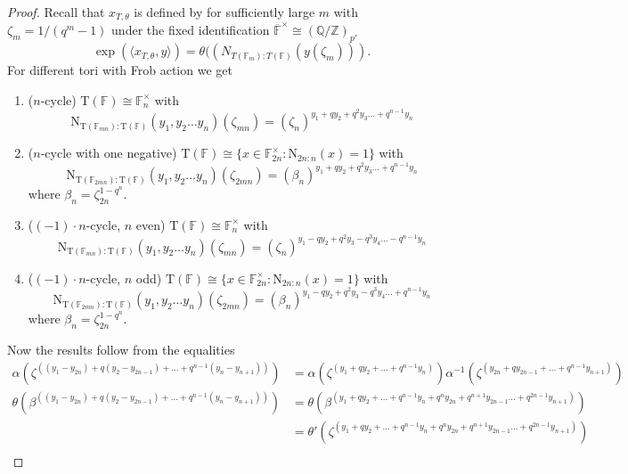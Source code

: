 \documentclass[12pt, reqno]{amsart}
\theoremstyle{definition}
\theoremstyle{definition}
\theoremstyle{definition}
\newcommand{\multiplicativegroup}[1]{#1^{\times}}
\newcommand{\FieldNorm}[2]{\mathrm{N}_{#1:#2}}
\newcommand{\finiteField}{\mathbb{F}}
\newcommand{\algebraicClosure}[1]{\overline{#1}}
\newcommand{\algebraicGroup}[1]{\boldsymbol{\mathrm{#1}}}
\begin{document}
\begin{proof}
Recall that $x_{T,\theta}$ is defined by for sufficiently large $m$ with $\zeta_m = 1/(q^m-1)$ under the fixed identification $\multiplicativegroup{\algebraicClosure{\finiteField}} \cong (\mathbb{Q}/\mathbb{Z})_{p'}$
\[
    \exp(\langle x_{T,\theta},y\rangle) = \theta((N_{T(\finiteField_m):T(\finiteField)}(y(\zeta_m))).
\]
For different tori with Frob action we get
\begin{enumerate}
    \item ($n$-cycle) $\algebraicGroup{T}(\finiteField) \cong \finiteField_n^\times$ with $$\FieldNorm{\algebraicGroup{T}(\finiteField_{mn})}{\algebraicGroup{T}(\finiteField)}(y_1,y_2 \hdots y_n)(\zeta_{mn}) = (\zeta_n)^{y_1+qy_2+q^2y_3 \hdots +q^{n-1}y_n}$$
    \item ($n$-cycle with one negative) $\algebraicGroup{T}(\finiteField) \cong \{x \in \finiteField_{2n}^\times: \FieldNorm{2n}{n}(x) = 1\}$ with $$\FieldNorm{\algebraicGroup{T}(\finiteField_{2mn})}{\algebraicGroup{T}(\finiteField)}(y_1,y_2 \hdots y_n)(\zeta_{2mn}) = (\beta_n)^{y_1+qy_2+q^2y_3 \hdots +q^{n-1}y_n}$$
    where $\beta_n = \zeta_{2n}^{1-q^n}$.
    \item ($(-1) \cdot n$-cycle, $n$ even) $\algebraicGroup{T}(\finiteField) \cong \finiteField_n^\times$ with $$\FieldNorm{\algebraicGroup{T}(\finiteField_{mn})}{\algebraicGroup{T}(\finiteField)}(y_1,y_2 \hdots y_n)(\zeta_{mn}) = (\zeta_n)^{y_1-qy_2+q^2y_3-q^3y_4 \hdots -q^{n-1}y_n}$$
    \item ($(-1) \cdot n$-cycle, $n$ odd) $\algebraicGroup{T}(\finiteField) \cong \{x \in \finiteField_{2n}^\times: \FieldNorm{2n}{n}(x) = 1\}$ with $$\FieldNorm{\algebraicGroup{T}(\finiteField_{2mn})}{\algebraicGroup{T}(\finiteField)}(y_1,y_2 \hdots y_n)(\zeta_{2mn}) = (\beta_n)^{y_1-qy_2+q^2y_3-q^3y_4 \hdots +q^{n-1}y_n}$$
    where $\beta_n = \zeta_{2n}^{1-q^n}$.
\end{enumerate}
Now the results follow from the equalities
\begin{align*}
	\alpha(\zeta^{((y_1-y_{2n})+q(y_2-y_{2n-1}) + \hdots +q^{n-1}(y_{n}-y_{n+1}))})&=\alpha(\zeta^{(y_1+qy_2 + \hdots +q^{n-1}y_{n})}) \alpha^{-1}(\zeta^{(y_{2n}+qy_{2n-1} + \hdots +q^{n-1}y_{n+1})}) \\
	\theta(\beta^{((y_1-y_{2n})+q(y_2-y_{2n-1}) + \hdots +q^{n-1}(y_{n}-y_{n+1}))})&=\theta(\beta^{(y_1+qy_2 + \hdots + q^{n-1}y_{n} + q^ny_{2n}+q^{n+1}y_{2n-1} \hdots +q^{2n-1}y_{n+1})}) \\
	&=\theta'(\zeta^{(y_1+qy_2 + \hdots + q^{n-1}y_{n} + q^ny_{2n}+q^{n+1}y_{2n-1} \hdots +q^{2n-1}y_{n+1})})\\

\end{align*}
\end{proof}
\end{document}
